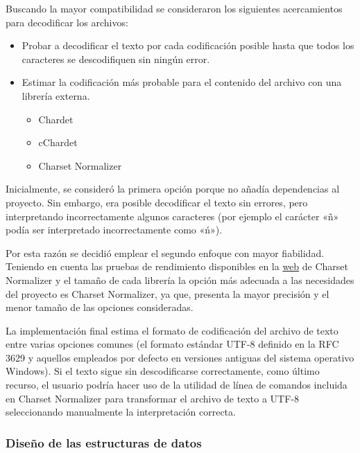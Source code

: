 Buscando la mayor compatibilidad se consideraron los siguientes acercamientos para decodificar los archivos:

\begin{itemize}
	\item{Probar a decodificar el texto por cada codificación posible hasta que todos los caracteres se descodifiquen sin ningún error.}
	\item{Estimar la codificación más probable para el contenido del archivo con una librería externa.}
	\begin{itemize}
		\item{Chardet}
		\item{cChardet}
		\item{Charset Normalizer}
	\end{itemize}
\end{itemize}

Inicialmente, se consideró la primera opción porque no añadía dependencias al proyecto. Sin embargo, era posible decodificar el texto sin errores, pero interpretando incorrectamente algunos caracteres (por ejemplo el carácter «ñ» podía ser interpretado incorrectamente como «ń»).

Por esta razón se decidió emplear el segundo enfoque con mayor fiabilidad. Teniendo en cuenta las pruebas de rendimiento disponibles en la \href{https://github.com/Ousret/charset_normalizer}{web} de Charset Normalizer y el tamaño de cada librería la opción más adecuada a las necesidades del proyecto es Charset Normalizer, ya que, presenta la mayor precisión y el menor tamaño de las opciones consideradas.

La implementación final estima el formato de codificación del archivo de texto entre varias opciones comunes (el formato estándar UTF-8 definido en la RFC 3629 \cite{rfc3629} y aquellos empleados por defecto en versiones antiguas del sistema operativo Windows). Si el texto sigue sin descodificarse correctamente, como último recurso, el usuario podría hacer uso de la utilidad de línea de comandos incluida en Charset Normalizer para transformar el archivo de texto a UTF-8 seleccionando manualmente la interpretación correcta.

\subsubsection{Diseño de las estructuras de datos}

